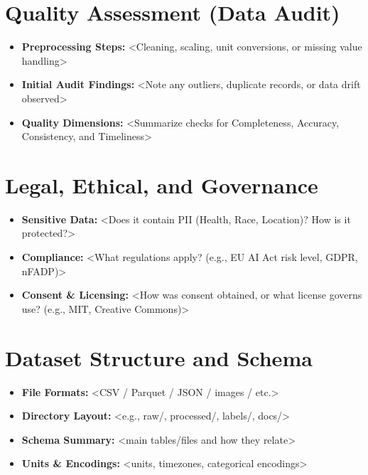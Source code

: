 \documentclass[11pt, a4paper]{article}
\begin{document}
\section{Quality Assessment (Data Audit)}
\begin{itemize}
    \item \textbf{Preprocessing Steps:} <Cleaning, scaling, unit conversions, or missing value handling>
    \item \textbf{Initial Audit Findings:} <Note any outliers, duplicate records, or data drift observed>
    \item \textbf{Quality Dimensions:} <Summarize checks for Completeness, Accuracy, Consistency, and Timeliness>
\end{itemize}

\section{Legal, Ethical, and Governance}
\begin{itemize}
    \item \textbf{Sensitive Data:} <Does it contain PII (Health, Race, Location)? How is it protected?>
    \item \textbf{Compliance:} <What regulations apply? (e.g., EU AI Act risk level, GDPR, nFADP)>
    \item \textbf{Consent \& Licensing:} <How was consent obtained, or what license governs use? (e.g., MIT, Creative Commons)>
\end{itemize}

\section{Dataset Structure and Schema}
\begin{itemize}
    \item \textbf{File Formats:} <CSV / Parquet / JSON / images / etc.> 
    \item \textbf{Directory Layout:} <e.g., raw/, processed/, labels/, docs/>
    \item \textbf{Schema Summary:} <main tables/files and how they relate>
    \item \textbf{Units \& Encodings:} <units, timezones, categorical encodings>
\end{itemize}
\end{document}
